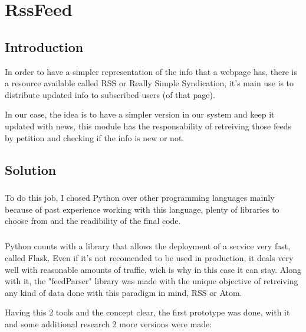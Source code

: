 
\chapter{RssFeed}
\section{Introduction}
In order to have a simpler representation of the info that a webpage has, there is a resource available called RSS or Really Simple Syndication, it's main use is to distribute updated info to subscribed users (of that page).

In our case, the idea is to have a simpler version in our system and keep it updated with news, this module has the responsability of retreiving those feeds by petition and checking if the info is new or not.

\section{Solution}
\paragraph{} 
To do this job, I chosed Python over other programming languages mainly because of past experience working with this language, plenty of libraries to choose from and the readibility of the final code.
\paragraph{}
Python counts with a library that allows the deployment of a service very fast, called Flask. Even if it's not recomended to be used in production, it deals very well with reasonable amounts of traffic, wich is why in this case it can stay.
Along with it, the "feedParser" library was made with the unique objective of retreiving any kind of data done with this paradigm in mind, RSS or Atom.

Having this 2 tools and the concept clear, the first prototype was done, with it and some additional research 2 more versions were made:
